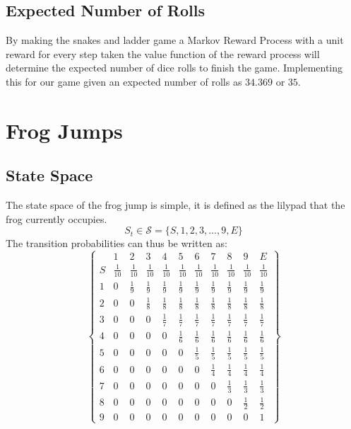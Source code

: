 \documentclass[11pt]{article}
\begin{document}
\subsection{Expected Number of Rolls}
By making the snakes and ladder game a Markov Reward Process with a unit reward for every step taken the value function of the reward process will determine the expected number of dice rolls to finish the game. Implementing this for our game given an expected number of rolls as $34.369$ or $35$.

\newpage
\section{Frog Jumps}
\subsection{State Space}
The state space of the frog jump is simple, it is defined as the lilypad that the frog currently occupies.
$$S_t \in \mathcal{S} = \{S, 1, 2, 3, ..., 9, E\}$$
The transition probabilities can thus be written as:
$$
\begin{Bmatrix}
    & 1 & 2 & 3 & 4 & 5 & 6 & 7 & 8 & 9 & E\\
   S & \frac{1}{10} & \frac{1}{10} & \frac{1}{10} & \frac{1}{10} & \frac{1}{10} & \frac{1}{10} & \frac{1}{10} & \frac{1}{10} & \frac{1}{10}& \frac{1}{10}\\
   1 & 0 & \frac{1}{9} & \frac{1}{9} & \frac{1}{9} & \frac{1}{9} & \frac{1}{9} & \frac{1}{9} & \frac{1}{9} & \frac{1}{9}& \frac{1}{9}\\
   2 & 0 & 0 & \frac{1}{8} & \frac{1}{8} & \frac{1}{8} & \frac{1}{8} & \frac{1}{8} & \frac{1}{8} & \frac{1}{8}& \frac{1}{8}\\
   3 & 0 & 0 & 0 & \frac{1}{7} & \frac{1}{7} & \frac{1}{7} & \frac{1}{7} & \frac{1}{7} & \frac{1}{7}& \frac{1}{7}\\
   4 & 0 & 0 & 0 & 0 & \frac{1}{6} & \frac{1}{6} & \frac{1}{6} & \frac{1}{6} & \frac{1}{6}& \frac{1}{6}\\
   5 & 0 & 0 & 0 & 0 & 0 & \frac{1}{5} & \frac{1}{5} & \frac{1}{5} & \frac{1}{5}& \frac{1}{5}\\
   6 & 0 & 0 & 0 & 0 & 0 & 0 & \frac{1}{4} & \frac{1}{4} & \frac{1}{4} & \frac{1}{4}\\
   7 & 0 & 0 & 0 & 0 & 0 & 0 & 0 & \frac{1}{3} & \frac{1}{3}& \frac{1}{3}\\
   8 & 0 & 0 & 0 & 0 & 0 & 0 & 0 & 0 & \frac{1}{2}& \frac{1}{2}\\
   9 & 0 & 0 & 0 &0 & 0 & 0 & 0 & 0 & 0 & 1
\end{Bmatrix}
$$
\end{document}
